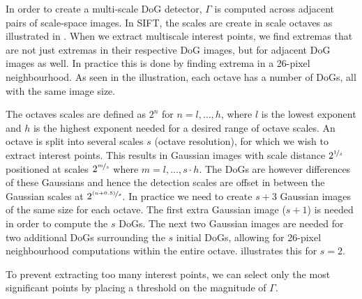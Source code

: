 \documentclass[thesis.tex]{subfiles}
\begin{document}
In order to create a multi-scale DoG detector, $\Gamma$ is computed across adjacent pairs of scale-space images. In SIFT, the scales are create in scale octaves as illustrated in . When we extract multiscale interest points, we find extremas that are not just extremas in their respective DoG images, but for adjacent DoG images as well. In practice this is done by finding extrema in a 26-pixel neighbourhood. As seen in the illustration, each octave has a number of DoGs, all with the same image size.

The octaves scales are defined as $2^n$ for $n = l,\hdots,h$, where $l$ is the lowest exponent and $h$ is the highest exponent needed for a desired range of octave scales. An octave is split into several scales $s$ (octave resolution), for which we wish to extract interest points. This results in Gaussian images with scale distance $2^{\nicefrac{1}{s}}$ positioned at scales $2^{\nicefrac{m}{s}}$ where $m = l,\hdots,s \cdot h$. The DoGs are however differences of these Gaussians and hence the detection scales are offset in between the Gaussian scales at $2^{\nicefrac{(n+0.5)}{s}}$.
In practice we need to create $s+3$ Gaussian images of the same size for each octave. The first extra Gaussian image ($s+1$) is needed in order to compute the $s$ DoGs. The next two Gaussian images are needed for two additional DoGs surrounding the $s$ initial DoGs, allowing for 26-pixel neighbourhood computations within the entire octave.  illustrates this for $s = 2$.

To prevent extracting too many interest points, we can select only the most significant points by placing a threshold on the magnitude of $\Gamma$.
\end{document}
